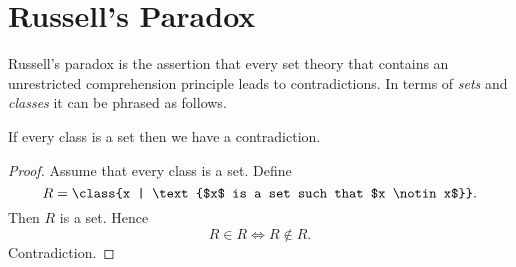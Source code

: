 \documentclass{article}
\begin{document}
  \section{Russell's Paradox}

  Russell's paradox is the assertion that every set theory that contains an
  unrestricted comprehension principle leads to contradictions.
  In terms of \textit{sets} and \textit{classes} it can be phrased as follows.

  \begin{forthel}
    \begin{theorem}\label{russell}
      If every class is a set then we have a contradiction.
    \end{theorem}
    \begin{proof}
      Assume that every class is a set.
      Define \[ R = \class{x | \text{$x$ is a set such that $x \notin x$}}. \]
      Then $R$ is a set.
      Hence \[ R \in R \iff R \notin R. \]
      Contradiction.
    \end{proof}
  \end{forthel}
\end{document}

